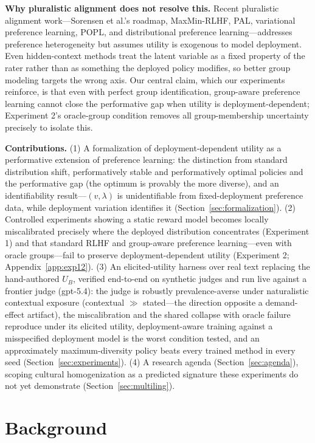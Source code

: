 ﻿\documentclass[11pt]{article}
\begin{document}
\textbf{Why pluralistic alignment does not resolve this.} Recent pluralistic alignment work---Sorensen et al.'s roadmap, MaxMin-RLHF, PAL, variational preference learning, POPL, and distributional preference learning---addresses preference heterogeneity but assumes utility is exogenous to model deployment. Even hidden-context methods treat the latent variable as a fixed property of the rater rather than as something the deployed policy modifies, so better group modeling targets the wrong axis. Our central claim, which our experiments reinforce, is that even with perfect group identification, group-aware preference learning cannot close the performative gap when utility is deployment-dependent; Experiment 2's oracle-group condition removes all group-membership uncertainty precisely to isolate this.

\textbf{Contributions.} (1) A formalization of deployment-dependent utility as a performative extension of preference learning: the distinction from standard distribution shift, performatively stable and performatively optimal policies and the performative gap (the optimum is provably the more diverse), and an identifiability result---\((v, \lambda)\) is unidentifiable from fixed-deployment preference data, while deployment variation identifies it (Section~\ref{sec:formalization}). (2) Controlled experiments showing a static reward model becomes locally miscalibrated precisely where the deployed distribution concentrates (Experiment 1) and that standard RLHF and group-aware preference learning---even with oracle groups---fail to preserve deployment-dependent utility (Experiment 2; Appendix~\ref{app:exp12}). (3) An elicited-utility harness over real text replacing the hand-authored \(U_B\), verified end-to-end on synthetic judges and run live against a frontier judge (gpt-5.4): the judge is robustly prevalence-averse under naturalistic contextual exposure (contextual \(\gg\) stated---the direction opposite a demand-effect artifact), the miscalibration and the shared collapse with oracle failure reproduce under its elicited utility, deployment-aware training against a misspecified deployment model is the worst condition tested, and an approximately maximum-diversity policy beats every trained method in every seed (Section~\ref{sec:experiments}). (4) A research agenda (Section~\ref{sec:agenda}), scoping cultural homogenization as a predicted signature these experiments do not yet demonstrate (Section~\ref{sec:multiling}).

\section{Background}
\label{sec:background}
\end{document}
